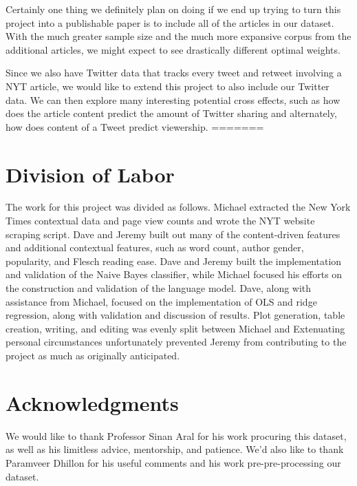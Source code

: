 \documentclass[fleqn,12pt]{SelfArx} %
\begin{document}
Certainly one thing we definitely plan on doing if we end up trying to turn this project into a publishable paper is to include all of the articles in our dataset. With the much greater sample size and the much more expansive corpus from the additional articles, we might expect to see drastically different optimal weights. 

Since we also have Twitter data that tracks every tweet and retweet involving a NYT article, we would like to extend this project to also include our Twitter data. We can then explore many interesting potential cross effects, such as how does the article content predict the amount of Twitter sharing and alternately, how does content of a Tweet predict viewership.
=======
\section{Division of Labor}

The work for this project was divided as follows. Michael extracted the New York Times contextual data and page view counts and wrote the NYT website scraping script. Dave and Jeremy built out many of the content-driven features and additional contextual features, such as word count, author gender, popularity, and Flesch reading ease. Dave and Jeremy built the implementation and validation of the Naive Bayes classifier, while Michael focused his efforts on the construction and validation of the language model. Dave, along with assistance from Michael, focused on the implementation of OLS and ridge regression, along with validation and discussion of results. Plot generation, table creation, writing, and editing was evenly split between Michael and Extenuating personal circumstances unfortunately prevented Jeremy from contributing to the project as much as originally anticipated.

\section*{Acknowledgments} %

We would like to thank Professor Sinan Aral for his work procuring this dataset, as well as his limitless advice, mentorship, and patience. We'd also like to thank Paramveer Dhillon for his useful comments and his work pre-pre-processing our dataset.





\end{document}
